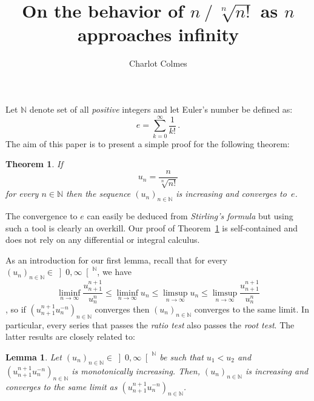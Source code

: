 \documentclass[12pt]{article}
\newcommand{\bN}{\mathbb{N}} %
\newcommand{\Rpos}{\left]0, \infty\right[} %
\newtheorem{theorem}{Theorem}
\newtheorem{lemma}{Lemma}
\begin{document}
\sloppy

\title{On the behavior of $n \mathbin{/} \sqrt[n]{n!}$ as $n$ approaches infinity} 
\author{Charlot Colmes}
\maketitle

Let $\bN$ denote set of all \emph{positive} integers and
let Euler's number be defined as:
$$
e = \sum_{k = 0}^\infty \frac{1}{k!} \,. 
$$
The aim of this paper is to present a simple proof for the following theorem:

\begin{theorem} \label{thm:factnn-e}
If
$$
u_n = \frac{n}{\sqrt[n]{n!}}
$$
for every $n \in \bN$ then
the sequence $\left( u_n  \right)_{n \in \bN}$ is increasing and converges to~$e$.
\end{theorem}

The convergence to $e$ can easily be deduced from \emph{Stirling's formula}
\cite{GiaquintaModicaApprox, RudinPrinciples}
but using such a tool is clearly an overkill.
Our proof of Theorem~\ref{thm:factnn-e} is self-contained and 
does not rely on any differential or integral calculus.

As an introduction for our first lemma,
recall that for every $\left( u_n \right)_{n \in \bN} \in \Rpos^\bN$, we have 
$$
\liminf_{n \to \infty} \frac{u_{n + 1}^{n + 1}}{ u_n^{n}} 
\le
\liminf_{n \to \infty} u_n 
\le
\limsup_{n \to \infty} u_n
\le 
\limsup_{n \to \infty} \frac{u_{n + 1}^{n + 1}}{u_n^{n}} 
$$
\cite{RudinPrinciples},
so if $\left( u_{n + 1}^{n + 1} u_n^{- n} \right)_{n \in \bN}$ converges then
$\left( u_n \right)_{n \in \bN}$ converges to the same limit.
In particular, every series that passes the \emph{ratio test} also passes the \emph{root test}.
The latter results are closely related to:

\begin{lemma} \label{lem:root-vs-ratio}
  Let $\left( u_n \right)_{n \in \bN}  \in \Rpos^{\bN}$ be such that
  $u_1 < u_2$ and  
  $\left(  u_{n + 1}^{n + 1}  u_n^{-n} \right)_{n \in \bN}$ is monotonically increasing.
  Then,
  $\left(u_n \right)_{n \in \bN}$ is increasing and
  converges to the same limit as $\left(  u_{n + 1}^{n + 1}  u_n^{-n} \right)_{n \in \bN}$.
\end{lemma}
\end{document}
